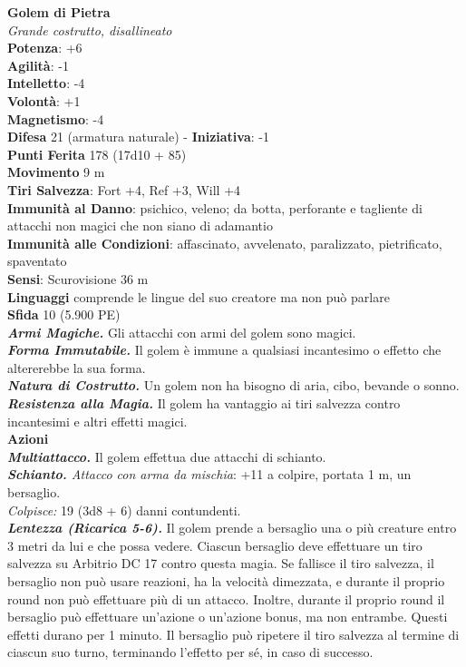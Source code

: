 \begin{multicols}{2}
\medskip\textbf{Golem di Pietra}\\
\emph{Grande costrutto, disallineato}\\
\textbf{Potenza}: +6 \\
\textbf{Agilità}: -1\\
\textbf{Intelletto}: -4\\
\textbf{Volontà}: +1\\
\textbf{Magnetismo}: -4\\
\textbf{Difesa} 21 (armatura naturale) - \textbf{Iniziativa}: -1\\
\textbf{Punti Ferita} 178 (17d10 + 85)\\
\textbf{Movimento} 9 m\\
\textbf{Tiri Salvezza}: Fort +4, Ref +3, Will +4\\
\textbf{Immunità al Danno}: psichico, veleno; da botta, perforante e tagliente di attacchi non magici che non siano di adamantio\\
\textbf{Immunità alle Condizioni}: affascinato, avvelenato, paralizzato, pietrificato, spaventato\\
\textbf{Sensi}: Scurovisione 36 m\\
\textbf{Linguaggi} comprende le lingue del suo creatore ma non può parlare\\
\textbf{Sfida} 10 (5.900 PE)\smallskip\\
\emph{\textbf{Armi Magiche.}} Gli attacchi con armi del golem sono magici.\\
\emph{\textbf{Forma Immutabile.}} Il golem è immune a qualsiasi incantesimo o effetto che altererebbe la sua forma.\\
\emph{\textbf{Natura di Costrutto.}} Un golem non ha bisogno di aria, cibo, bevande o sonno.\\
\emph{\textbf{Resistenza alla Magia.}} Il golem ha vantaggio ai tiri salvezza contro incantesimi e altri effetti magici.\\
\smallskip\textbf{Azioni} \\
\emph{\textbf{Multiattacco.}} Il golem effettua due attacchi di schianto.\\
\emph{\textbf{Schianto.} Attacco con arma da mischia}: +11 a colpire, portata 1 m, un bersaglio.\\
\emph{Colpisce:} 19 (3d8 + 6) danni contundenti.\\
\emph{\textbf{Lentezza (Ricarica 5-6).}} Il golem prende a bersaglio una o più creature entro 3 metri da lui e che possa vedere. Ciascun bersaglio deve effettuare un tiro salvezza su Arbitrio DC 17 contro questa magia. Se fallisce il tiro salvezza, il bersaglio non può usare reazioni, ha la velocità dimezzata, e durante il proprio round non può effettuare più di un attacco. Inoltre,  durante il proprio round il bersaglio può effettuare un'azione o un'azione bonus, ma non entrambe. Questi effetti durano per 1 minuto. Il bersaglio può ripetere il tiro salvezza al termine di ciascun suo turno, terminando l'effetto per sé, in caso di successo.\\

\end{multicols}

